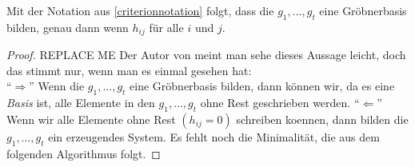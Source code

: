 \documentclass{article}
\begin{document}
	\begin{thm}
		Mit der Notation aus \ref{criterionnotation} folgt,
		dass die 
		\( g_{1},\dots,g_{t} \)
		eine Gr\"obnerbasis bilden,
		genau dann wenn 
		\( h_{ij} \)
		f\"ur alle 
		\( i \)
		und 
		\( j\).
		\begin{proof}
			{\color{red} REPLACE ME }
			Der Autor von \cite{Eis1} 
			meint man sehe dieses Aussage leicht, 
			doch das stimmt nur,
			wenn man es einmal gesehen hat:\\
			``\( \Rightarrow \)'' Wenn die 
			\( g_{1},\dots,g_{t} \) 
			eine Gr\"obnerbasis bilden,
			dann k\"onnen wir, 
			da es eine \emph{Basis} ist,
			alle Elemente in den 
			\( g_{1},\dots,g_{t} \)
			ohne Rest geschrieben werden.
			``\(\Leftarrow \)'' Wenn wir alle Elemente ohne Rest
			\( \left( h_{ij} = 0 \right) \)
			schreiben koennen, 
			dann bilden die 
			\( g_{1},\dots,g_{t} \)
			ein erzeugendes System.
			Es fehlt noch die Minimalit\"at,
			die aus dem folgenden Algorithmus folgt.
		\end{proof}
	\end{thm}
\end{document}
